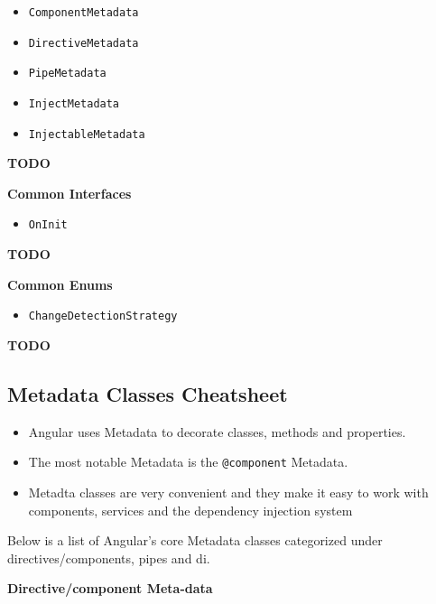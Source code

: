 \documentclass[12pt,]{article}
\providecommand{\tightlist}{%
  \setlength{\itemsep}{0pt}\setlength{\parskip}{0pt}}
\begin{document}
\begin{itemize}
\tightlist
\item
  \texttt{ComponentMetadata}
\item
  \texttt{DirectiveMetadata}
\item
  \texttt{PipeMetadata}
\item
  \texttt{InjectMetadata}
\item
  \texttt{InjectableMetadata}
\end{itemize}

\textbf{TODO}

\textbf{Common Interfaces}

\begin{itemize}
\tightlist
\item
  \texttt{OnInit}
\end{itemize}

\textbf{TODO}

\textbf{Common Enums}

\begin{itemize}
\tightlist
\item
  \texttt{ChangeDetectionStrategy}
\end{itemize}

\textbf{TODO}

\subsection{Metadata Classes
Cheatsheet}\label{metadata-classes-cheatsheet}

\begin{itemize}
\tightlist
\item
  Angular uses Metadata to decorate classes, methods and properties.
\item
  The most notable Metadata is the \texttt{@component} Metadata.
\item
  Metadta classes are very convenient and they make it easy to work with
  components, services and the dependency injection system
\end{itemize}

Below is a list of Angular's core Metadata classes categorized under
directives/components, pipes and di.

\textbf{Directive/component Meta-data}
\end{document}

